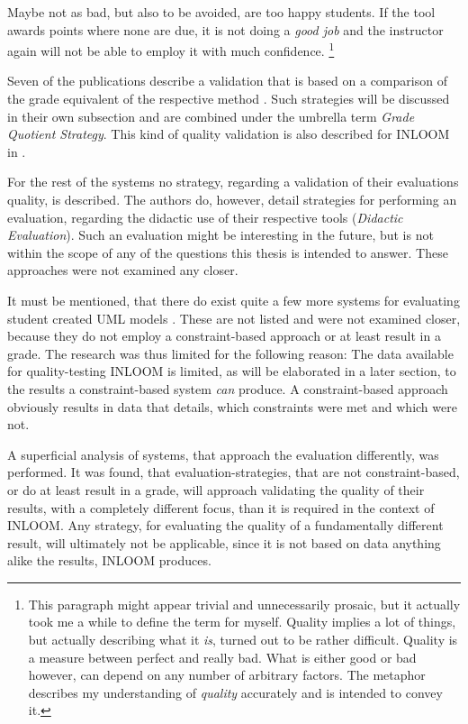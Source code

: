 Maybe not as bad, but also to be avoided, are too happy students. If the tool awards points 
where none are due, it is not doing a \textit{good job} and the instructor again will not be 
able to employ it with much confidence. 
\footnote{This paragraph might appear trivial and unnecessarily prosaic, but it actually took
me a while to define the term for myself. Quality implies a lot of things, but actually 
describing what it \textit{is}, turned out to be rather difficult. Quality is a measure between
perfect and really bad. What is either good or bad however, can depend on any number of 
arbitrary factors. The metaphor describes my understanding of \textit{quality} accurately 
and is intended to convey it.}

Seven of the publications describe a validation that is based on a comparison of the grade 
equivalent of the respective method \cite{6, 15, 16, 17, 18, 19}. Such strategies will be 
discussed in their own subsection and are combined under the umbrella term 
\textit{Grade Quotient Strategy}. This kind of quality validation is also described for INLOOM
in \cite{1}. 

For the rest of the systems no strategy, regarding a validation of their evaluations quality,
is described. The authors do, however, detail strategies for performing an evaluation, 
regarding the didactic use of their respective tools \cite{10, 23, 24} 
(\textit{Didactic Evaluation}). Such an evaluation might be interesting in the future, but is 
not within the scope of any of the questions this thesis is intended to answer. These 
approaches were not examined any closer. 

It must be mentioned, that there do exist quite a few more systems for evaluating student 
created UML models \cite{20, 21, 22}. These are not listed and were not examined closer, because 
they do not employ a constraint-based approach or at least result in a grade. The research was
thus limited for the following reason: The data available for quality-testing INLOOM is limited, 
as will be elaborated in a later section, to the results a constraint-based system \textit{can} 
produce. A constraint-based approach obviously results in data that details, which constraints
were met and which were not. 

A superficial analysis of systems, that approach the evaluation differently, was performed. 
It was found, that evaluation-strategies, that are not constraint-based, or do at least result 
in a grade, will approach validating the quality of their results, with a completely different 
focus, than it is required in the context of INLOOM. Any strategy, for evaluating the quality of 
a fundamentally different result, will ultimately not be applicable, since it is not based on 
data anything alike the results, INLOOM produces.

